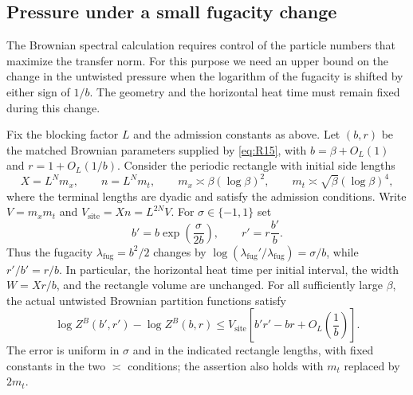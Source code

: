 \subsection{Pressure under a small fugacity change}
\label{subsec:comparison-pressure}

The Brownian spectral calculation requires control of the particle numbers
that maximize the transfer norm.  For this purpose we need an upper bound
on the change in the untwisted pressure when the logarithm of the fugacity
is shifted by either sign of $1/b$.  The geometry and the horizontal heat
time must remain fixed during this change.

\begin{lemma}
\label{lem:comparison-nearby-fugacity}
Fix the blocking factor $L$ and the admission constants as above.  Let
$(b,r)$ be the matched Brownian parameters supplied by
\eqref{eq:R15}, with $b=\beta+O_L(1)$ and $r=1+O_L(1/b)$.
Consider the periodic rectangle with initial side lengths
\[
  X=L^N m_x,\qquad n=L^N m_t,\qquad
  m_x\asymp\beta(\log\beta)^2,\qquad
  m_t\asymp\sqrt\beta(\log\beta)^4,
\]
where the terminal lengths are dyadic and satisfy the admission conditions.
Write $V=m_xm_t$ and $V_{\mathrm{site}}=Xn=L^{2N}V$.
For $\sigma\in\{-1,1\}$ set
\[
  b'=b\exp\!\left(\frac{\sigma}{2b}\right),\qquad
  r'=r\frac{b'}b.
\]
Thus the fugacity $\lambda_{\mathrm{fug}}=b^2/2$ changes by
$\log(\lambda_{\mathrm{fug}}'/\lambda_{\mathrm{fug}})=\sigma/b$, while $r'/b'=r/b$.
In particular, the horizontal heat time per initial interval, the width
$W=Xr/b$, and the rectangle volume are unchanged.  For all sufficiently
large $\beta$, the actual untwisted Brownian partition functions satisfy
\begin{equation}
  \log Z^B(b',r')-\log Z^B(b,r)
  \le V_{\mathrm{site}}
       \left[b'r'-br+O_L\!\left(\frac1b\right)\right].
  \label{eq:R17}
\end{equation}
The error is uniform in $\sigma$ and in the indicated rectangle lengths,
with fixed constants in the two $\asymp$ conditions;
the assertion also holds with $m_t$ replaced by $2m_t$.
\end{lemma}

